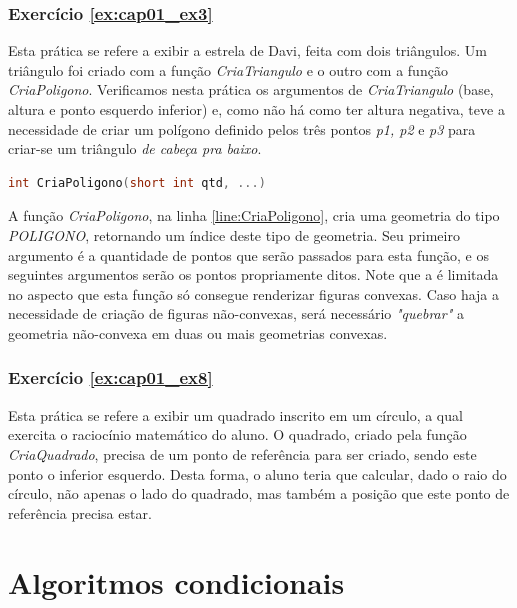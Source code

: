 \subsection*{Exercício \ref{ex:cap01_ex3}}

Esta prática se refere a exibir a estrela de Davi, feita com dois triângulos. Um triângulo foi criado com a função \emph{CriaTriangulo} e o outro com a função \emph{CriaPoligono}. Verificamos nesta prática os argumentos de \emph{CriaTriangulo} (base, altura e ponto esquerdo inferior) e, como não há como ter altura negativa, teve a necessidade de criar um polígono definido pelos três pontos \emph{p1, p2} e \emph{p3} para criar-se um triângulo \emph{de cabeça pra baixo}.


\begin{lstlisting}[label={func:CriaPoligono},language=C++]
int CriaPoligono(short int qtd, ...)
\end{lstlisting}
A função \emph{CriaPoligono}, na linha \ref{line:CriaPoligono}, cria uma geometria do tipo \emph{POLIGONO}, retornando um índice deste tipo de geometria. Seu primeiro argumento é a quantidade de pontos que serão passados para esta função, e os seguintes argumentos serão os pontos propriamente ditos. Note que a \playAPC{} é limitada no aspecto que esta função só consegue renderizar figuras convexas. Caso haja a necessidade de criação de figuras não-convexas, será necessário \emph{"quebrar"} a geometria não-convexa em duas ou mais geometrias convexas.

\subsection*{Exercício \ref{ex:cap01_ex8}}

Esta prática se refere a exibir um quadrado inscrito em um círculo, a qual exercita o raciocínio matemático do aluno. O quadrado, criado pela função \emph{CriaQuadrado}, precisa de um ponto de referência para ser criado, sendo este ponto o inferior esquerdo. Desta forma, o aluno teria que calcular, dado o raio do círculo, não apenas o lado do quadrado, mas também a posição que este ponto de referência precisa estar.




\chapter[Algoritmos condicionais]
{Algoritmos condicionais}



